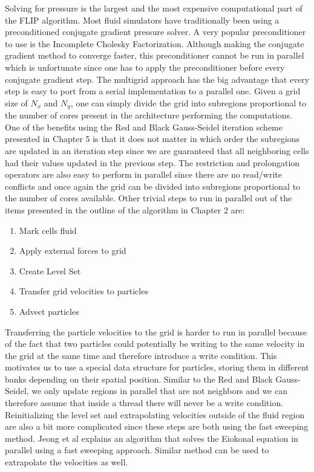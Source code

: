 Solving for pressure is the largest and the most expensive computational part of the FLIP algorithm. Most fluid simulators have traditionally been using a preconditioned conjugate gradient pressure solver. A very popular preconditioner to use is the Incomplete Cholesky Factorization. Although making the conjugate gradient method to converge faster, this preconditioner cannot be run in parallel which is unfortunate since one has to apply the preconditioner before every conjugate gradient step. The multigrid approach has the big advantage that every step is easy to port from a serial implementation to a parallel one. Given a grid size of $N_x$ and $N_y$, one can simply divide the grid into subregions proportional to the number of cores present in the architecture performing the computations. One of the benefits using the Red and Black Gauss-Seidel iteration scheme presented in Chapter 5 is that it does not matter in which order the subregions are updated in an iteration step since we are guaranteed that all neighboring cells had their values updated in the previous step. The restriction and prolongation operators are also easy to perform in parallel since there are no read/write conflicts and once again the grid can be divided into subregions proportional to the number of cores available. Other trivial steps to run in parallel out of the items presented in the outline of the algorithm in Chapter 2 are:

\begin{enumerate}
\item Mark cells fluid
\item Apply external forces to grid
\item Create Level Set
\item Transfer grid velocities to particles
\item Advect particles
\end{enumerate}
\noindent
Transferring the particle velocities to the grid is harder to run in parallel because of the fact that two particles could potentially be writing to the same velocity in the grid at the same time and therefore introduce a write condition. This motivates us to use a special data structure for particles, storing them in different banks depending on their spatial position. Similar to the Red and Black Gauss-Seidel, we only update regions in parallel that are not neighbors and we can therefore assume that inside a thread there will never be a write condition.
\newline
\newline
Reinitializing the level set and extrapolating velocities outside of the fluid region are also a bit more complicated since these steps are both using the fast sweeping method. Jeong et al\cite{jeong}  explains an algorithm that solves the Eiokonal equation in parallel using a fast sweeping approach. Similar method can be used to extrapolate the velocities as well.
